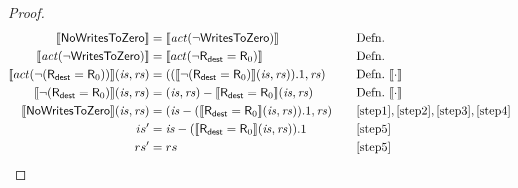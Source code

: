 \documentclass[12pt, letterpaper]{article}
\newcommand\interp[1]{\llbracket #1 \rrbracket}
\begin{document}
\begin{proof}
{\small
  \hfill \\
  \begin{alignat}{2}
    \label{step1}
    \interp{\mathsf{NoWritesToZero}}
    &= \interp{\mathit{act}(\neg \mathsf{WritesToZero})}
    &&\quad \text{Defn.}\\
    \label{step2}
    \interp{\mathit{act}(\neg \mathsf{WritesToZero})}
    &= \interp{act(\neg \mathsf{R}_{\mathsf{dest}} = \mathsf{R}_0)}
    &&\quad \text{Defn.}\\
    \label{step3}
    \interp{act(\neg(\mathsf{R}_{\mathsf{dest}} = \mathsf{R}_0))}(\mathit{is},\mathit{rs})
    &= ((\interp{\neg(\mathsf{R}_{\mathsf{dest}} = \mathsf{R}_0)}(\mathit{is},\mathit{rs})).1, \mathit{rs})
    &&\quad \text{Defn.}\ \interp{\cdot}\\    
    \label{step4}
    \interp{\neg(\mathsf{R}_{\mathsf{dest}} = \mathsf{R}_0)}(\mathit{is},\mathit{rs})
    &= (\mathit{is},\mathit{rs}) - \interp{\mathsf{R}_{\mathsf{dest}} = \mathsf{R}_0}(\mathit{is},\mathit{rs})
    &&\quad \text{Defn.}\ \interp{\cdot}\\    
    \label{step5}
    \interp{\mathsf{NoWritesToZero}}(\mathit{is},\mathit{rs})
    &= (\mathit{is} - (\interp{\mathsf{R}_{\mathsf{dest}} = \mathsf{R}_0}(\mathit{is},\mathit{rs})).1, \mathit{rs})
    &&\quad \ref{step1},\ref{step2},\ref{step3},\ref{step4}\\
    \label{step6}
    is' &= \mathit{is} - (\interp{\mathsf{R}_{\mathsf{dest}} = \mathsf{R}_0}(\mathit{is},\mathit{rs})).1
    &&\quad \ref{step5} \\
    \label{step7}
    rs' &= rs 
    &&\quad \ref{step5}
  \end{alignat}
}%
\end{proof}
\end{document}
